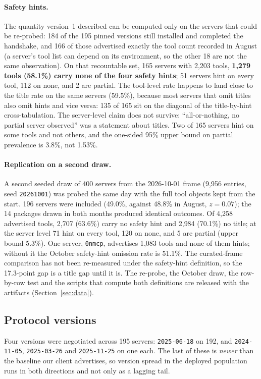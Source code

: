 \documentclass[11pt]{article}
\begin{document}
\paragraph{Safety hints.}
The quantity version~1 described can be computed only on the servers that could
be re-probed: 184 of the 195 pinned versions still installed and completed the
handshake, and 166 of those advertised exactly the tool count recorded in August
(a server's tool list can depend on its environment, so the other 18 are not the
same observation). On that recountable set, 165 servers with 2{,}203 tools,
\textbf{1{,}279 tools (58.1\%) carry none of the four safety hints}; 51 servers
hint on every tool, 112 on none, and 2 are partial. The tool-level rate happens to
land close to the title rate on the same servers (59.5\%), because most servers
that omit titles also omit hints and vice versa: 135 of 165 sit on the diagonal
of the title-by-hint cross-tabulation. The server-level claim does not survive:
``all-or-nothing, no partial server observed'' was a statement about titles. Two of
165 servers hint on some tools and not others, and the one-sided 95\% upper bound
on partial prevalence is 3.8\%, not 1.53\%.

\paragraph{Replication on a second draw.}
A second seeded draw of 400 servers from the 2026-10-01 frame (9{,}956 entries,
seed \texttt{20261001}) was probed the same day with the full tool objects kept
from the start. 196 servers were included (49.0\%, against 48.8\% in August,
$z=0.07$); the 14 packages drawn in both months produced identical outcomes. Of
4{,}258 advertised tools, 2{,}707 (63.6\%) carry no safety hint and 2{,}984
(70.1\%) no title; at the server level 71 hint on every tool, 120 on none, and 5
are partial (upper bound 5.3\%). One server, \texttt{0nmcp}, advertises 1{,}083
tools and none of them hints; without it the October safety-hint omission rate is
51.1\%. The curated-frame comparison has not been re-measured under the safety-hint
definition, so the 17.3-point gap is a title gap until it is. The re-probe, the
October draw, the row-by-row test and the scripts that compute both definitions
are released with the artifacts (Section~\ref{sec:data}).

\subsection{Protocol versions}
Four versions were negotiated across 195 servers: \texttt{2025-06-18} on 192,
and \texttt{2024-11-05}, \texttt{2025-03-26} and \texttt{2025-11-25} on one each.
The last of these is \emph{newer} than the baseline our client advertises, so
version spread in the deployed population runs in both directions and not only as
a lagging tail.
\end{document}

